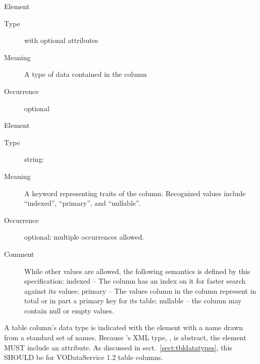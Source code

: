 \documentclass[11pt,a4paper]{ivoa}
\begin{document}
\begin{generated}
\begingroup\small\begin{bigdescription}\item[Element \xmlel{dataType}]
\begin{description}
\item[Type]  with optional attributes
\item[Meaning] 
                        A type of data contained in the column
                     
\item[Occurrence] optional

\end{description}
\item[Element \xmlel{flag}]
\begin{description}
\item[Type] string: 
\item[Meaning] 
                        A keyword representing traits of the column.  
                        Recognized values include “indexed”, “primary”, and
                        “nullable”.  
                     
\item[Occurrence] optional; multiple occurrences allowed.
\item[Comment] 
                     	While other values are allowed, the following semantics
                     	is defined by this specification: indexed – The column
                     	has an index on it for faster search against its values;
                     	primary – The values column in the column represent in
                     	total or in part a primary key for its table; nullable –
                     	the column may contain null or empty values. 
                     

\end{description}


\end{bigdescription}\endgroup

\endgroup
\end{generated}



A table column's data type is indicated with the 
element with a name drawn from a standard set of names.  
Because 's
XML type, , is abstract, the
element MUST include an
 attribute.  As discussed in
sect.~\ref{sect:tbldatatypes}, this SHOULD be
 for VODataService 1.2 table columns.
\end{document}
